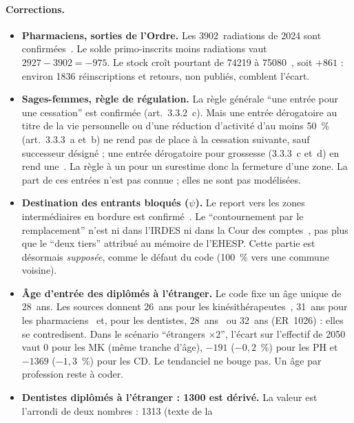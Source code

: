 \documentclass[11pt]{article}
\begin{document}
\paragraph{Corrections.}
\begin{itemize}
\item \textbf{Pharmaciens, sorties de l'Ordre.} Les \num{3902}~radiations
  de 2024 sont confirmées~\cite{cnop2024}. Le solde primo-inscrits moins
  radiations vaut $\num{2927}-\num{3902}=\num{-975}$\derive. Le stock croît
  pourtant de \num{74219} à \num{75080}~\cite{cnop2024}, soit
  $+\num{861}$\derive{} : environ \num{1836}\derive{} réinscriptions et
  retours, non publiés, comblent l'écart.
\item \textbf{Sages-femmes, règle de régulation.} La règle générale
  \enquote{une entrée pour une cessation} est confirmée (art.~3.3.2~c).
  Mais une entrée dérogatoire au titre de la vie personnelle ou d'une
  réduction d'activité d'au moins 50~\% (art.~3.3.3~a et~b) ne rend pas de
  place à la cessation suivante, sauf successeur désigné ; une entrée
  dérogatoire pour grossesse (3.3.3~c et~d) en rend une~\cite{avenant4sf}.
  La règle à un pour un surestime donc la fermeture d'une zone. La part de
  ces entrées n'est pas connue ; elles ne sont pas modélisées.
\item \textbf{Destination des entrants bloqués ($\psi$).} Le report vers les
  zones intermédiaires en bordure est confirmé~\cite{irdes270}. Le
  \enquote{contournement par le remplacement} n'est ni dans l'IRDES ni dans
  la Cour des comptes~\cite{irdes270,ccomptes2024}, pas plus que le
  \enquote{deux tiers} attribué au mémoire de l'EHESP. Cette partie est
  désormais \emph{supposée}\suppose{}, comme le défaut du code (100~\%\suppose{}
  vers une commune voisine).
\item \textbf{Âge d'entrée des diplômés à l'étranger.} Le code fixe un âge
  unique de 28~ans\suppose. Les sources donnent 26~ans pour les
  kinésithérapeutes~\cite{er1075}, 31~ans pour les pharmaciens~\cite{dd76}
  et, pour les dentistes, 28~ans~\cite{dd76} ou 32~ans (ER~1026) : elles se
  contredisent. Dans le scénario \enquote{étrangers $\times 2$}, l'écart sur
  l'effectif de 2050 vaut 0\mesure{} pour les MK (même tranche d'âge),
  $\num{-191}$\mesure{} ($-0{,}2$~\%\derive) pour les PH et
  $\num{-1369}$\mesure{} ($-1{,}3$~\%\derive) pour les CD. Le tendanciel ne
  bouge pas. Un âge par profession reste à coder.
\item \textbf{Dentistes diplômés à l'étranger : \num{1300} est dérivé.} La
  valeur est l'arrondi\derive{} de deux nombres : \num{1313} (texte de la

\end{itemize}
\end{document}
